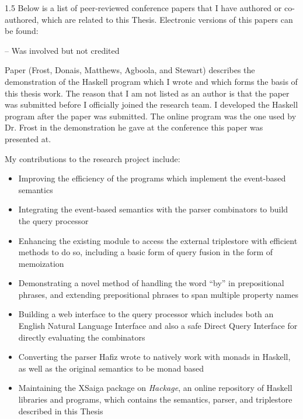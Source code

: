 \documentclass[fleqn, oneside, 12pt]{book}
\theoremstyle{definitionsty}
\newcommand{\uwinonehalfspacelen}{1.5}
\newcommand{\uwindefaultspacelen}{\uwinonehalfspacelen}
\newenvironment{uwindefaultspaceenv}%
{\begin{spacing}{\uwindefaultspacelen}}%
	{\end{spacing}}
\begin{document}
\begin{uwindefaultspaceenv}
Below is a list of peer-reviewed conference papers that I have authored or co-authored, which are related to this Thesis.  Electronic versions of this papers can be found: %



\cite{donais2013system} 

\cite{peelar2017windsor} 

\cite{peelar2018toolpath} 

\cite{frost2014demonstration}  -- Was involved but not credited

Paper \cite{frost2014demonstration} (Frost, Donais, Matthews, Agboola, and Stewart) describes the demonstration of the Haskell program which I wrote and which forms the basis of this thesis work.  The reason that I am not listed as an author is that the paper was submitted before I officially joined the research team.  I developed the Haskell program after the paper was submitted.  The online program was the one used by Dr. Frost in the demonstration he gave at the conference this paper was presented at.

My contributions to the research project include:

\begin{itemize}
	\item Improving the efficiency of the programs which implement the event-based semantics
	\item Integrating the event-based semantics with the parser combinators to build the query processor
	\item Enhancing the existing module to access the external triplestore with efficient methods to do so, including a basic form of query fusion in the form of memoization
	\item Demonstrating a novel method of handling the word ``by'' in prepositional phrases, and extending prepositional phrases to span multiple property names
	\item Building a web interface to the query processor which includes both an English Natural Language Interface and also a safe Direct Query Interface for directly evaluating the combinators
	\item Converting the parser Hafiz wrote\cite{frosthafiz2008} to natively work with monads in Haskell, as well as the original semantics\cite{frost2014demonstration} to be monad based
	\item Maintaining the XSaiga package on {\em Hackage}\cite{XSaiga:2016}, an online repository of Haskell libraries and programs, which contains the semantics, parser, and triplestore described in this Thesis
\end{itemize}


\end{uwindefaultspaceenv}
\end{document}
